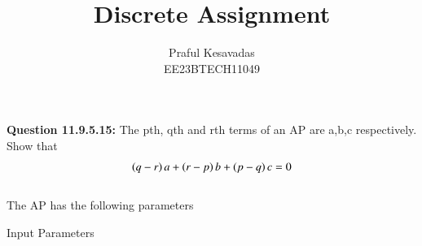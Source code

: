 \documentclass[journal,12pt,onecolumn]{IEEEtran}
\theoremstyle{remark}
\begin{document}
\let\vec\mathbf







\bigskip

\renewcommand{\thefigure}{\theenumi}
\renewcommand{\thetable}{\theenumi}


\title{Discrete Assignment}
\author{Praful Kesavadas\\ EE23BTECH11049}
\maketitle
\textbf{Question 11.9.5.15:}
The pth, qth and rth terms of an AP are a,b,c respectively. Show that
\begin{align*} \left(q-r\right)a + \left(r-p\right)b +\left(p-q\right)c =0 \end{align*}
\solution\\
The AP has the following parameters
\begin{table}[ht!]
    \centering
    
    \caption{Input Parameters}
\end{table}
\end{document}
